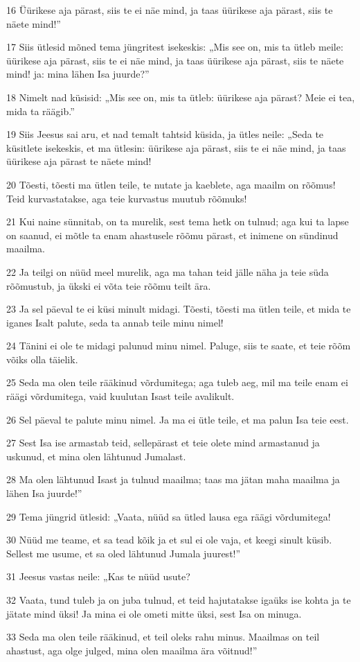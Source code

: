 \par 16 Üürikese aja pärast, siis te ei näe mind, ja taas üürikese aja pärast, siis te näete mind!”
\par 17 Siis ütlesid mõned tema jüngritest isekeskis: „Mis see on, mis ta ütleb meile: üürikese aja pärast, siis te ei näe mind, ja taas üürikese aja pärast, siis te näete mind! ja: mina lähen Isa juurde?”
\par 18 Nimelt nad küsisid: „Mis see on, mis ta ütleb: üürikese aja pärast? Meie ei tea, mida ta räägib.”
\par 19 Siis Jeesus sai aru, et nad temalt tahtsid küsida, ja ütles neile: „Seda te küsitlete isekeskis, et ma ütlesin: üürikese aja pärast, siis te ei näe mind, ja taas üürikese aja pärast te näete mind!
\par 20 Tõesti, tõesti ma ütlen teile, te nutate ja kaeblete, aga maailm on rõõmus! Teid kurvastatakse, aga teie kurvastus muutub rõõmuks!
\par 21 Kui naine sünnitab, on ta murelik, sest tema hetk on tulnud; aga kui ta lapse on saanud, ei mõtle ta enam ahastusele rõõmu pärast, et inimene on sündinud maailma.
\par 22 Ja teilgi on nüüd meel murelik, aga ma tahan teid jälle näha ja teie süda rõõmustub, ja ükski ei võta teie rõõmu teilt ära.
\par 23 Ja sel päeval te ei küsi minult midagi. Tõesti, tõesti ma ütlen teile, et mida te iganes Isalt palute, seda ta annab teile minu nimel!
\par 24 Tänini ei ole te midagi palunud minu nimel. Paluge, siis te saate, et teie rõõm võiks olla täielik.
\par 25 Seda ma olen teile rääkinud võrdumitega; aga tuleb aeg, mil ma teile enam ei räägi võrdumitega, vaid kuulutan Isast teile avalikult.
\par 26 Sel päeval te palute minu nimel. Ja ma ei ütle teile, et ma palun Isa teie eest.
\par 27 Sest Isa ise armastab teid, sellepärast et teie olete mind armastanud ja uskunud, et mina olen lähtunud Jumalast.
\par 28 Ma olen lähtunud Isast ja tulnud maailma; taas ma jätan maha maailma ja lähen Isa juurde!”
\par 29 Tema jüngrid ütlesid: „Vaata, nüüd sa ütled lausa ega räägi võrdumitega!
\par 30 Nüüd me teame, et sa tead kõik ja et sul ei ole vaja, et keegi sinult küsib. Sellest me usume, et sa oled lähtunud Jumala juurest!”
\par 31 Jeesus vastas neile: „Kas te nüüd usute?
\par 32 Vaata, tund tuleb ja on juba tulnud, et teid hajutatakse igaüks ise kohta ja te jätate mind üksi! Ja mina ei ole ometi mitte üksi, sest Isa on minuga.
\par 33 Seda ma olen teile rääkinud, et teil oleks rahu minus. Maailmas on teil ahastust, aga olge julged, mina olen maailma ära võitnud!”


